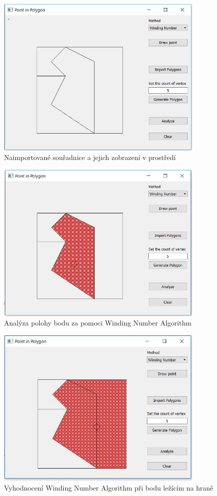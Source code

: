 \documentclass[a4paper, 12pt]{article}
\begin{document}
\begin{figure}[h!]
	\centering
	\includegraphics[width=10cm]{import.jpg}
	\caption{Naimportované souřadnice a jejich zobrazení v prostředí}
\end{figure}

\begin{figure}[h!]
	\centering
	\includegraphics[width=10cm]{analyze_inside.jpg}
	\caption{Analýza polohy bodu za pomoci Winding Number Algorithm}
\end{figure}

\begin{figure}[h!]
	\centering
	\includegraphics[width=10cm]{winding_boundary.jpg}
	\caption{Vyhodnocení Winding Number Algorithm při bodu ležícím na hraně}
\end{figure}
\end{document}
